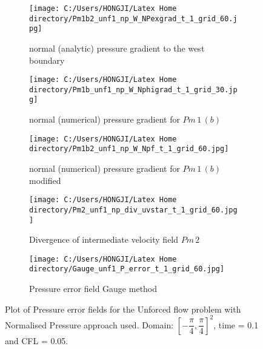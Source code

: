 \begin{figure}[H]
	\centering
	\begin{subfigure}[t]{2.5in}
		\centering
		\texttt{[image: C:/Users/HONGJI/Latex Home directory/Pm1b2\_unf1\_np\_W\_NPexgrad\_t\_1\_grid\_60.jpg]}
		\caption{normal (analytic) pressure gradient to the west boundary}\label{fig:6.19a}		
	\end{subfigure}
	\quad
	\begin{subfigure}[t]{2.5in}
		\centering
		\texttt{[image: C:/Users/HONGJI/Latex Home directory/Pm1b\_unf1\_np\_W\_Nphigrad\_t\_1\_grid\_30.jpg]}
		\caption{normal (numerical) pressure gradient for $Pm\,1\,(b)$}\label{fig:6.19b}
	\end{subfigure}
	\quad
	\centering
	\begin{subfigure}[t]{2.5in}
		\centering
		\texttt{[image: C:/Users/HONGJI/Latex Home directory/Pm1b2\_unf1\_np\_W\_Npf\_t\_1\_grid\_60.jpg]}
		\caption{normal (numerical) pressure gradient for $Pm\,1\,(b)$ modified}\label{fig:6.19a}		
	\end{subfigure}
	\quad
	\begin{subfigure}[t]{2.5in}
		\centering
		\texttt{[image: C:/Users/HONGJI/Latex Home directory/Pm2\_unf1\_np\_div\_uvstar\_t\_1\_grid\_60.jpg]}
		\caption{Divergence of intermediate velocity field $Pm\,2$}\label{fig:6.19b}
	\end{subfigure}
	\quad
	\begin{subfigure}[t]{2.5in}
		\centering
		\texttt{[image: C:/Users/HONGJI/Latex Home directory/Gauge\_unf1\_P\_error\_t\_1\_grid\_60.jpg]}
		\caption{Pressure error field Gauge method }\label{fig:6.19b}
	\end{subfigure}
	\caption{Plot of Pressure error fields for the Unforced flow problem with Normalised Pressure approach used. Domain: $[-\dfrac{\pi}{4}, \dfrac{\pi}{4}]^2$, time = 0.1 and CFL = 0.05.}\label{fig:6.16}
\end{figure}
